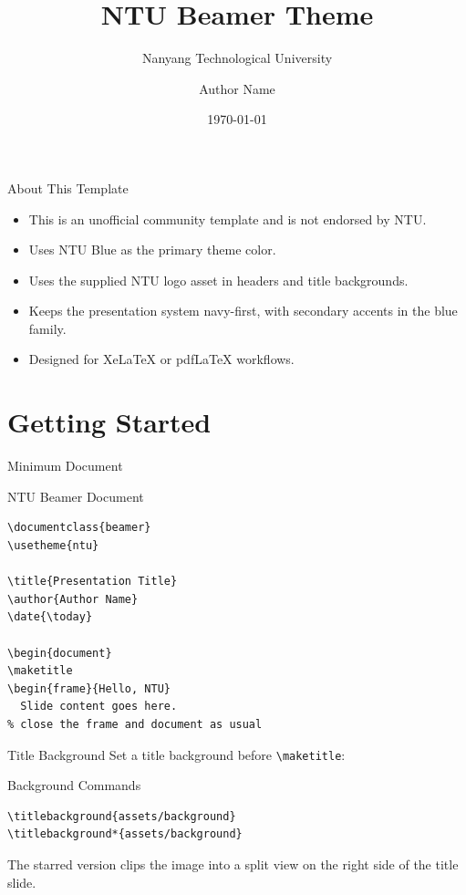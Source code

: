 \documentclass{beamer}
\title{NTU Beamer Theme}
\subtitle{Nanyang Technological University}
\author{Author Name}
\date{\today}
\begin{document}
\maketitle

\begin{frame}{About This Template}
\begin{itemize}
\item This is an unofficial community template and is not endorsed by NTU.
\item Uses NTU Blue as the primary theme color.
\item Uses the supplied NTU logo asset in headers and title backgrounds.
\item Keeps the presentation system navy-first, with secondary accents in the blue family.
\item Designed for XeLaTeX or pdfLaTeX workflows.
\end{itemize}
\end{frame}

\section{Getting Started}

\begin{frame}[fragile]{Minimum Document}
\begin{block}{NTU Beamer Document}
\begin{verbatim}
\documentclass{beamer}
\usetheme{ntu}

\title{Presentation Title}
\author{Author Name}
\date{\today}

\begin{document}
\maketitle
\begin{frame}{Hello, NTU}
  Slide content goes here.
% close the frame and document as usual
\end{verbatim}
\end{block}
\end{frame}

\begin{frame}[fragile]{Title Background}
Set a title background before \verb|\maketitle|:
\begin{block}{Background Commands}
\begin{verbatim}
\titlebackground{assets/background}
\titlebackground*{assets/background}
\end{verbatim}
\end{block}
The starred version clips the image into a split view on the right side of the
title slide.
\end{frame}
\end{document}
